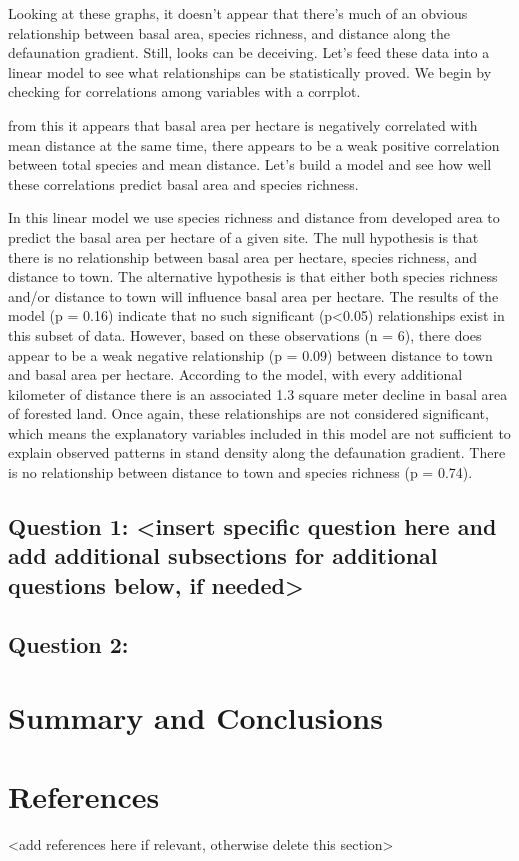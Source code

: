 \documentclass[
  12pt,
]{article}
\begin{document}
Looking at these graphs, it doesn't appear that there's much of an
obvious relationship between basal area, species richness, and distance
along the defaunation gradient. Still, looks can be deceiving. Let's
feed these data into a linear model to see what relationships can be
statistically proved. We begin by checking for correlations among
variables with a corrplot.

from this it appears that basal area per hectare is negatively
correlated with mean distance at the same time, there appears to be a
weak positive correlation between total species and mean distance. Let's
build a model and see how well these correlations predict basal area and
species richness.

In this linear model we use species richness and distance from developed
area to predict the basal area per hectare of a given site. The null
hypothesis is that there is no relationship between basal area per
hectare, species richness, and distance to town. The alternative
hypothesis is that either both species richness and/or distance to town
will influence basal area per hectare. The results of the model (p =
0.16) indicate that no such significant (p\textless0.05) relationships
exist in this subset of data. However, based on these observations (n =
6), there does appear to be a weak negative relationship (p = 0.09)
between distance to town and basal area per hectare. According to the
model, with every additional kilometer of distance there is an
associated 1.3 square meter decline in basal area of forested land. Once
again, these relationships are not considered significant, which means
the explanatory variables included in this model are not sufficient to
explain observed patterns in stand density along the defaunation
gradient. There is no relationship between distance to town and species
richness (p = 0.74).

\hypertarget{question-1-insert-specific-question-here-and-add-additional-subsections-for-additional-questions-below-if-needed}{%
\subsection{Question 1: \textless insert specific question here and add
additional subsections for additional questions below, if
needed\textgreater{}}\label{question-1-insert-specific-question-here-and-add-additional-subsections-for-additional-questions-below-if-needed}}

\hypertarget{question-2}{%
\subsection{Question 2:}\label{question-2}}

\newpage

\hypertarget{summary-and-conclusions}{%
\section{Summary and Conclusions}\label{summary-and-conclusions}}

\newpage

\hypertarget{references}{%
\section{References}\label{references}}

\textless add references here if relevant, otherwise delete this
section\textgreater{}
\end{document}
